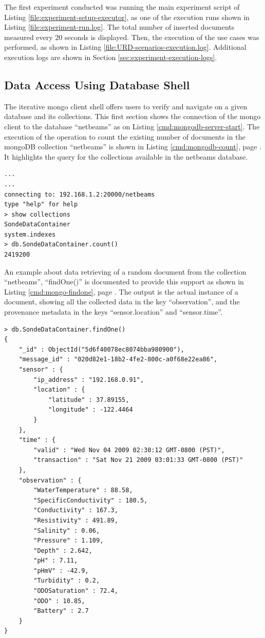 The first experiment conducted was running the main experiment script of Listing
\ref{file:experiment-setup-executor}, as one of the execution runs shown in
Listing \ref{file:experiment-run.log}. The total number of inserted documents
measured every 20 seconds is displayed. Then, the execution of the use cases
was performed, as shown in Listing \ref{file:URD-scenarios-execution.log}.
Additional execution logs are shown in Section
\ref{sec:experiment-execution-logs}.

\subsection{Data Access Using Database Shell}
\label{sec:mongodb-user-experience}

The iterative mongo client shell offers users to verify and navigate on a
given database and its collections. This first section shows the connection of
the mongo client to the database ``netbeams'' as on Listing
\ref{cmd:mongodb-server-start}. The execution of the operation to count the
existing number of documents in the mongoDB collection ``netbeams'' is shown in
Listing \ref{cmd:mongodb-count}, page \pageref{cmd:mongodb-count}. It
highlights the query for the collections available in the netbeams database.

\lstset{label=cmd:mongodb-count,caption=Starting the Server}
\begin{lstlisting}
...
...
connecting to: 192.168.1.2:20000/netbeams
type "help" for help
> show collections
SondeDataContainer
system.indexes
> db.SondeDataContainer.count()
2419200
\end{lstlisting}

An example about data retrieving of a random document from the collection
``netbeams'', ``findOne()'' is documented to provide this support as shown in
Listing \ref{cmd:mongo-findone}, page \pageref{cmd:mongo-findone}. The output
is the actual instance of a document, showing all the collected data in the
key ``observation'', and the provenance metadata in the keys
``sensor.location'' and ``sensor.time''.

\lstset{label=cmd:mongo-findone,caption=Querying the database: one item}
\begin{lstlisting}
> db.SondeDataContainer.findOne()
{
    "_id" : ObjectId("5d6f40078ec8074bba980900"),
    "message_id" : "020d82e1-18b2-4fe2-800c-a0f68e22ea86",
    "sensor" : {
        "ip_address" : "192.168.0.91",
        "location" : {
            "latitude" : 37.89155,
            "longitude" : -122.4464
        }
    },
    "time" : {
        "valid" : "Wed Nov 04 2009 02:30:12 GMT-0800 (PST)",
        "transaction" : "Sat Nov 21 2009 03:01:33 GMT-0800 (PST)"
    },
    "observation" : {
        "WaterTemperature" : 88.58,
        "SpecificConductivity" : 180.5,
        "Conductivity" : 167.3,
        "Resistivity" : 491.89,
        "Salinity" : 0.06,
        "Pressure" : 1.109,
        "Depth" : 2.642,
        "pH" : 7.11,
        "pHmV" : -42.9,
        "Turbidity" : 0.2,
        "ODOSaturation" : 72.4,
        "ODO" : 10.85,
        "Battery" : 2.7
    }
}
\end{lstlisting}

